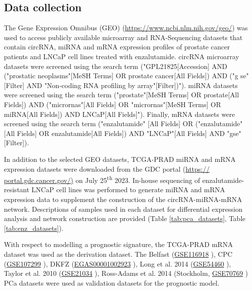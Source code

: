 \documentclass[twocolumn]{bmcart}%
\begin{document}
\subsection*{\textbf{Data collection}}
The Gene Expression Omnibus (GEO) \cite{Edgar2002Jan} (\url{https://www.ncbi.nlm.nih.gov/geo/}) was used to access publicly available microarray and RNA-Sequencing datasets that contain circRNA, miRNA and mRNA expression profiles of prostate cancer patients and LNCaP cell lines treated with enzalutamide. circRNA microarray datasets were screened using the search term ("GPL21825[Accession] AND ("prostatic neoplasms"[MeSH Terms] OR prostate cancer[All Fields]) AND ("g se"[Filter] AND "Non-coding RNA profiling by array"[Filter])"). miRNA datasets were screened using the search term ("prostate"[MeSH Terms] OR prostate[All Fields]) AND ("micrornas"[All Fields] OR "micrornas"[MeSH Terms] OR miRNA[All Fields]) AND LNCaP[All Fields]"). Finally, mRNA datasets were screened using the search term ("enzalutamide" [All Fields] OR ("enzalutamide"[All Fields] OR enzalutamide[All Fields]) AND "LNCaP"[All Fields] AND "gse"[Filter]).\par
In addition to the selected GEO datasets, TCGA-PRAD miRNA and mRNA expression datasets were downloaded from the GDC portal \cite{Grossman2016Sep} (\url{https:// portal.gdc.cancer.gov/)} on July 25\textsuperscript{th} 2023. In-house sequencing of enzalutamide-resistant LNCaP cell lines was performed to generate miRNA and mRNA expression data to supplement the construction of the circRNA-miRNA-mRNA network. Descriptions of samples used in each dataset for differential expression analysis and network construction are provided (Table \ref{tab:pca_datasets}, Table \ref{tab:enz_datasets}). \par
With respect to modelling a prognostic signature, the TCGA-PRAD mRNA dataset was used as the derivation dataset. The Belfast (\href{https://www.ncbi.nlm.nih.gov/geo/query/acc.cgi?acc=GSE116918}{GSE116918} \cite{Belfast}), CPC (\href{https://www.ncbi.nlm.nih.gov/geo/query/acc.cgi?acc=GSE107299}{GSE107299} \cite{CPC}), DKFZ (\href{https://ega-archive.org/studies/EGAS00001002923}{EGAS00001002923} \cite{DKFZ}), Long et al. 2014 (\href{https://www.ncbi.nlm.nih.gov/geo/query/acc.cgi?acc=GSE54460}{GSE54460} \cite{GSE54460}), Taylor et al. 2010 (\href{https://www.ncbi.nlm.nih.gov/geo/query/acc.cgi?acc=GSE21034}{GSE21034} \cite{Taylor}), Ross-Adams et al. 2014 (Stockholm, \href{https://www.ncbi.nlm.nih.gov/geo/query/acc.cgi?acc=GSE70769}{GSE70769} \cite{Stockholm}) PCa datasets were used as validation datasets for the prognostic model.
\end{document}

